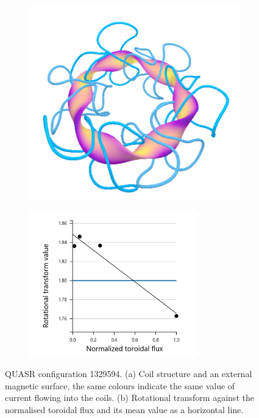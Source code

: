 \begin{figure}[H]
    \centering
    \begin{subfigure}[t]{0.49\textwidth}
        \centering
        \includegraphics[width=\textwidth]{images/quasrs/config-1329594.png}
        \caption{}
        \label{fig:coils-1329594}
    \end{subfigure}
    \hfill
    \begin{subfigure}[t]{0.49\textwidth}
        \centering
        \includegraphics[width=0.8\textwidth]{images/quasrs/iota-1329594.png}
        \caption{}
        \label{fig:iota-1329594}
    \end{subfigure}
    \caption{QUASR configuration 1329594. (a) Coil structure and an external magnetic surface, the same colours indicate the same value of current flowing into the coils. (b) Rotational transform against the normalised toroidal flux and its mean value as a horizontal line.}
    \label{fig:config-1329594}
\end{figure}

